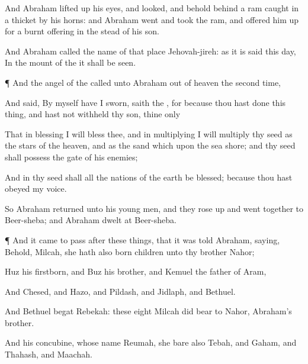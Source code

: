 {And
Abraham lifted
up his
eyes, and
looked, and behold
behind
{} a
ram
caught in a
thicket by his
horns: and
Abraham
went and
took the
ram, and offered him
up for a burnt
offering in the
stead of his
son.

And
Abraham
called the
name of that
place
Jehovah-jireh:
as it is
said
{} this
day, In the
mount of the
{} it shall be
seen.


\par }{\PP {}¶ And the
angel of the
{}
called unto
Abraham out of
heaven the second
time,

And
said, By myself have I
sworn,
saith the
{}, for
because thou hast
done this
thing, and hast
not
withheld thy
son, thine
only
{}

That in
blessing I will
bless thee, and in
multiplying I will
multiply thy
seed as the
stars of the
heaven, and as the
sand which
{} upon the
sea
shore; and thy
seed shall
possess the
gate of his
enemies;

And in thy
seed shall all the
nations of the
earth be
blessed;
because thou hast
obeyed my
voice.

So
Abraham
returned unto his young
men, and they rose
up and
went
together to
Beer-sheba; and
Abraham
dwelt at
Beer-sheba.


\par }{\PP {}¶ And it came to pass
after these
things, that it was
told
Abraham,
saying, Behold,
Milcah, she hath also
born
children unto thy
brother
Nahor;

Huz his
firstborn, and
Buz his
brother, and
Kemuel the
father of
Aram,

And
Chesed, and
Hazo, and
Pildash, and
Jidlaph, and
Bethuel.

And
Bethuel
begat
Rebekah: these
eight
Milcah did
bear to
Nahor,
Abraham’s
brother.

And his
concubine, whose
name
{}
Reumah, she
bare also
Tebah, and
Gaham, and
Thahash, and
Maachah.




\par }
